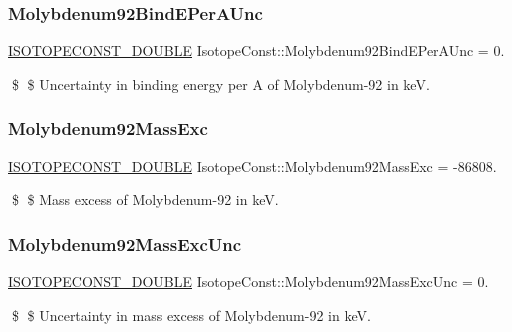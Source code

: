 \subsubsection{\texorpdfstring{Molybdenum92\+Bind\+E\+Per\+A\+Unc}{Molybdenum92BindEPerAUnc}}
{\footnotesize\ttfamily \mbox{\hyperlink{group___isotope_const-_macros_ga8f45a7272ce02c0b4c65c44636ed719a}{I\+S\+O\+T\+O\+P\+E\+C\+O\+N\+S\+T\+\_\+\+D\+O\+U\+B\+LE}} Isotope\+Const\+::\+Molybdenum92\+Bind\+E\+Per\+A\+Unc = 0.}

\$ \$ Uncertainty in binding energy per A of Molybdenum-\/92 in keV. \mbox{\label{group___isotope_const-_molybdenum-_mo92_ga31440578c4b838a930de06c03ac0936e}} 
\subsubsection{\texorpdfstring{Molybdenum92\+Mass\+Exc}{Molybdenum92MassExc}}
{\footnotesize\ttfamily \mbox{\hyperlink{group___isotope_const-_macros_ga8f45a7272ce02c0b4c65c44636ed719a}{I\+S\+O\+T\+O\+P\+E\+C\+O\+N\+S\+T\+\_\+\+D\+O\+U\+B\+LE}} Isotope\+Const\+::\+Molybdenum92\+Mass\+Exc = -\/86808.}

\$ \$ Mass excess of Molybdenum-\/92 in keV. \mbox{\label{group___isotope_const-_molybdenum-_mo92_ga35266222dc3255811886ef7fa1cd4813}} 
\subsubsection{\texorpdfstring{Molybdenum92\+Mass\+Exc\+Unc}{Molybdenum92MassExcUnc}}
{\footnotesize\ttfamily \mbox{\hyperlink{group___isotope_const-_macros_ga8f45a7272ce02c0b4c65c44636ed719a}{I\+S\+O\+T\+O\+P\+E\+C\+O\+N\+S\+T\+\_\+\+D\+O\+U\+B\+LE}} Isotope\+Const\+::\+Molybdenum92\+Mass\+Exc\+Unc = 0.}

\$ \$ Uncertainty in mass excess of Molybdenum-\/92 in keV. \mbox{\label{group___isotope_const-_molybdenum-_mo92_ga339e5ace808ad7068419e6ed38110e99}} 
